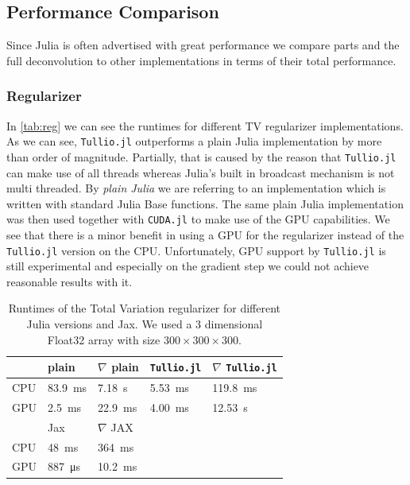 \documentclass{juliacon}
\begin{document}
    \subsection{Performance Comparison}
        Since Julia is often advertised with great performance we compare parts and the full deconvolution to other implementations in
        terms of their total performance.
        \subsubsection{Regularizer}
            In \autoref{tab:reg} we can see the runtimes for different TV regularizer implementations. As we can see, \verb|Tullio.jl| outperforms a plain 
            Julia implementation by more than order of magnitude. Partially, that is caused by the reason that \verb|Tullio.jl| can make 
            use of all threads whereas Julia's built in broadcast mechanism is not multi threaded.
            By \textit{plain Julia} we are referring to an implementation which is written with standard Julia Base functions.
            The same plain Julia implementation was then used together with \verb|CUDA.jl|
            to make use of the GPU capabilities. We see that there is a minor benefit in using a GPU for the regularizer instead of 
            the \verb|Tullio.jl| version on the CPU. Unfortunately, GPU support by \verb|Tullio.jl| is still experimental and especially on the gradient step 
            we could not achieve reasonable results with it.
            \begin{table}[h]
                \begin{tabular}{l l l l l}
                    & plain & $\nabla$ plain & \verb|Tullio.jl| & $\nabla$ \verb|Tullio.jl| \\
                \hline
                CPU & \SI{83.9}{\milli\second} & \SI{7.18}{\second} & \SI{5.53}{\milli\second}  & \SI{119.8}{\milli\second}   \\ 
                GPU & \SI{2.5}{\milli\second}  & \SI{22.9}{\milli\second}& \SI{4.00}{\milli\second}  & \SI{12.53}{\second} \\
                \hline
                \hline
                    & Jax & $\nabla$ JAX && \\
                \hline
                CPU & \SI{48}{\milli\second}   & \SI{364}{\milli\second}&   & \\
                GPU & \SI{887}{\micro\second}   & \SI{10.2}{\milli\second}&   &
                \end{tabular}
                \caption{Runtimes of the Total Variation regularizer for different Julia versions and Jax. 
                    We used a 3 dimensional Float32 array with size $300 \times 300 \times 300$.  }
                \label{tab:reg}
            \end{table}
\end{document}
